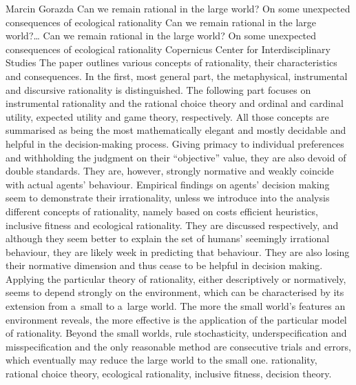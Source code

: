 \begin{artengenv}{Marcin Gorazda}
	{Can we remain rational in the large world? On some unexpected consequences of ecological rationality}
	{Can we remain rational in the large world?\ldots}
	{Can we remain rational in the large world? On some unexpected\\consequences of ecological rationality}
	{Copernicus Center for Interdisciplinary Studies}
	{The paper outlines various concepts of rationality, their characteristics and consequences. In the first, most general part, the metaphysical, instrumental and discursive rationality is distinguished. The following part focuses on instrumental rationality and the rational choice theory and ordinal and cardinal utility, expected utility and game theory, respectively. All those concepts are summarised as being the most mathematically elegant and mostly decidable and helpful in the decision-making process. Giving primacy to individual preferences and withholding the judgment on their ``objective'' value, they are also devoid of double standards. They are, however, strongly normative and weakly coincide with actual agents' behaviour. Empirical findings on agents' decision making seem to demonstrate their irrationality, unless we introduce into the analysis different concepts of rationality, namely based on costs efficient heuristics, inclusive fitness and ecological rationality. They are discussed respectively, and although they seem better to explain the set of humans' seemingly irrational behaviour, they are likely week in predicting that behaviour. They are also losing their normative dimension and thus cease to be helpful in decision making. Applying the particular theory of rationality, either descriptively or normatively, seems to depend strongly on the environment, which can be characterised by its extension from a~small to a~large world. The more the small world's features an environment reveals, the more effective is the application of the particular model of rationality. Beyond the small worlds, rule stochasticity, underspecification and misspecification and the only reasonable method are consecutive trials and errors, which eventually may reduce the large world to the small one.}
	{rationality, rational choice theory, ecological rationality, inclusive fitness, decision theory.}





\end{artengenv}
